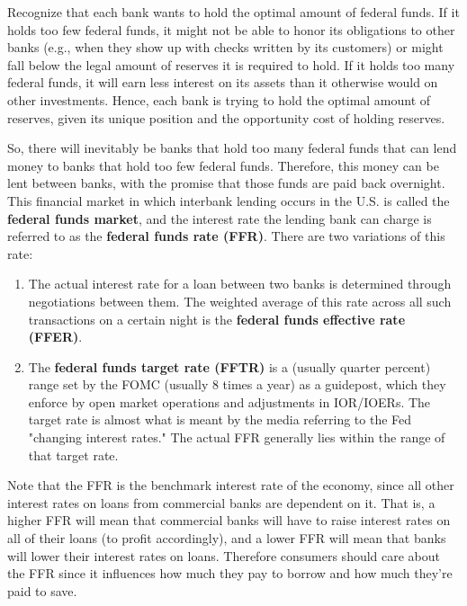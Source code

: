 \documentclass{article}
\begin{document}
    Recognize that each bank wants to hold the optimal amount of federal funds. If it holds too few federal funds, it might not be able to honor its obligations to other banks (e.g., when they show up with checks written by its customers) or might fall below the legal amount of reserves it is required to hold. If it holds too many federal funds, it will earn less interest on its assets than it otherwise would on other investments. Hence, each bank is trying to hold the optimal amount of reserves, given its unique position and the opportunity cost of holding reserves. 

    \begin{definition}
      So, there will inevitably be banks that hold too many federal funds that can lend money to banks that hold too few federal funds. Therefore, this money can be lent between banks, with the promise that those funds are paid back overnight. This financial market in which interbank lending occurs in the U.S. is called the \textbf{federal funds market}, and the interest rate the lending bank can charge is referred to as the \textbf{federal funds rate (FFR)}. There are two variations of this rate: 
      \begin{enumerate}
        \item The actual interest rate for a loan between two banks is determined through negotiations between them. The weighted average of this rate across all such transactions on a certain night is the \textbf{federal funds effective rate (FFER)}. 
        \item The \textbf{federal funds target rate (FFTR)} is a (usually quarter percent) range set by the FOMC (usually 8 times a year) as a guidepost, which they enforce by open market operations and adjustments in IOR/IOERs. The target rate is almost what is meant by the media referring to the Fed "changing interest rates." The actual FFR generally lies within the range of that target rate. 
      \end{enumerate}
    \end{definition}

    Note that the FFR is the benchmark interest rate of the economy, since all other interest rates on loans from commercial banks are dependent on it. That is, a higher FFR will mean that commercial banks will have to raise interest rates on all of their loans (to profit accordingly), and a lower FFR will mean that banks will lower their interest rates on loans. Therefore consumers should care about the FFR since it influences how much they pay to borrow and how much they're paid to save. 
\end{document}
